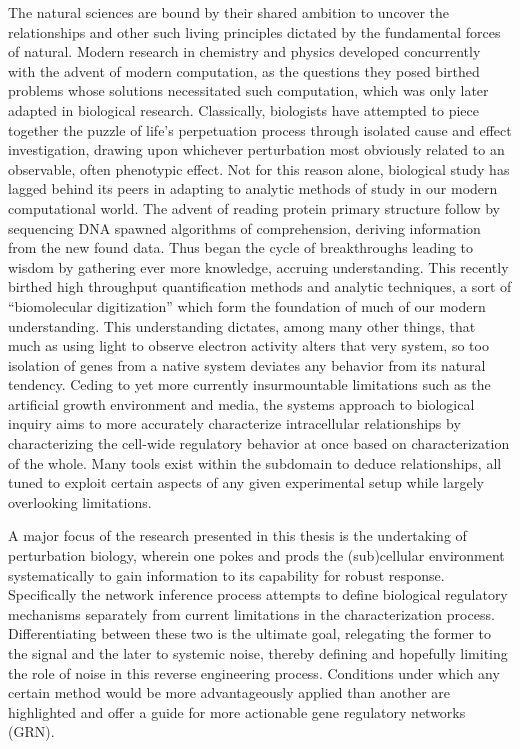 The natural sciences are bound by their shared ambition to uncover the relationships and other such living principles dictated by the fundamental forces of natural. Modern research in chemistry and physics developed concurrently with the advent of modern computation, as the questions they posed birthed problems whose solutions necessitated such computation, which was only later adapted in biological research. Classically, biologists have attempted to piece together the puzzle of life's perpetuation process through isolated cause and effect investigation, drawing upon whichever perturbation most obviously related to an observable, often phenotypic effect. Not for this reason alone, biological study has lagged behind its peers in adapting to analytic methods of study in our modern computational world. The advent of reading protein primary structure follow by sequencing DNA spawned algorithms of comprehension, deriving information from the new found data. Thus began the cycle of breakthroughs leading to wisdom by gathering ever more knowledge, \ie accruing understanding. This recently birthed high throughput quantification methods and analytic techniques, a sort of ``biomolecular digitization'' which form the foundation of much of our modern understanding. This understanding dictates, among many other things, that much as using light to observe electron activity alters that very system, so too isolation of genes from a native system deviates any behavior from its natural tendency. Ceding to yet more currently insurmountable limitations such as the artificial growth environment and media, the systems approach to biological inquiry aims to more accurately characterize intracellular relationships by characterizing the cell-wide regulatory behavior at once based on characterization of the whole. Many tools exist within the subdomain to deduce relationships, all tuned to exploit certain aspects of any given experimental setup while largely overlooking limitations.

A major focus of the research presented in this thesis is the undertaking of perturbation biology, wherein one pokes and prods the (sub)cellular environment systematically to gain information to its capability for robust response. Specifically the network inference process attempts to define biological regulatory mechanisms separately from current limitations in the characterization process. Differentiating between these two is the ultimate goal, relegating the former to the signal and the later to systemic noise, thereby defining and hopefully limiting the role of noise in this reverse engineering process. Conditions under which any certain method would be more advantageously applied than another are highlighted and offer a guide for more actionable gene regulatory networks (GRN). 

